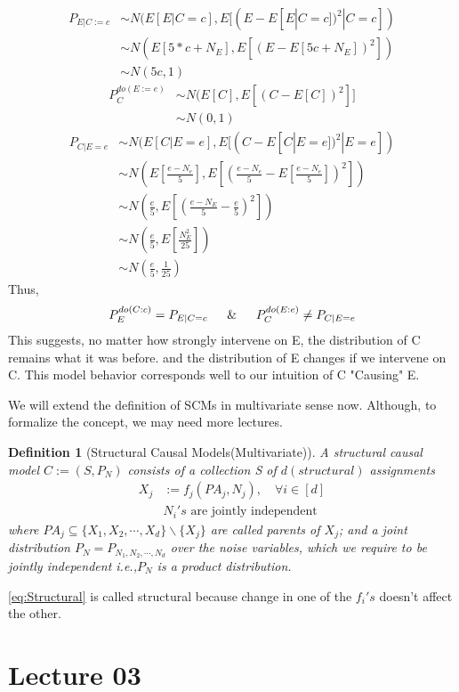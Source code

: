 \documentclass{article}
\newtheorem{definition}{Definition}[section]
\begin{document}
    \begin{align*}
        P_{E|C:=c} &\sim N(E[E|C=c],E[(E-E[E|C=c])^2|C=c])\\
        & \sim N(E[5*c+N_{E}],E[(E-E[5c+N_{E}])^2])\\
        & \sim N(5c,1)
    \end{align*}
    \begin{align*}
        P_C^{do(E:=e)}&\sim N(E[C],E[(C-E[C])^2]]\\
        &\sim N(0,1)
    \end{align*}
    \begin{align*}
        P_{C|E=e} &\sim N(E[C|E=e],E[(C-E[C|E=e])^2|E=e])\\
        &\sim N \left (E\left [\frac{e-N_{e}}{5} \right 
    ], E[\left( \frac{e-N_{e}}{5}-E\left [ \frac{e-N_{e}}{5}\right ]\right )^2]\right )\\
    & \sim N \left ( \frac{e}{5},E \left [ \left ( \frac{e-N_E}{5}-\frac{e}{5}\right )^2\right ]\right )\\
    & \sim N \left ( \frac{e}{5}, E \left [ \frac{N_E^2}{25}\right ]\right )\\
    & \sim N \left( \frac{e}{5},\frac{1}{25} \right)
    \end{align*}
    Thus,
    \begin{align}
        P_E^{do(C:c)}=P_{E|C=c} \quad \And \quad P_{C}^{do(E:e)} \neq P_{C|E=e}
    \end{align}
    This suggests, no matter how strongly intervene on E, the distribution of C remains what it was before.
    and the distribution of E changes if we intervene on C.
    This model behavior corresponds well to our intuition of C "Causing" E.

    We will extend the definition of SCMs in multivariate sense now. Although, to formalize the concept, we may need more lectures.
    \begin{definition}[Structural Causal Models(Multivariate)]
    A structural causal model $C:=(S,P_{N})$ consists of a collection S of $d(structural)$ assignments
    \begin{align}
      \label{eq:Structural}  X_{j}&:=f_{j}(PA_j,N_j), \quad \forall i\in [d]\\
        &\text{$N_{i}'s$ are jointly independent}
    \end{align}
    where $PA_{j} \subseteq \{ X_1,X_2,\cdots,X_{d}\} \backslash \{X_j\}$ are called parents of $X_j$; and a joint distribution $P_{N}=P_{N_1,N_2,\cdots,N_d}$ over the noise variables, which we require to be jointly independent i.e.,$P_N$ is a product distribution.
    \end{definition}
    \cref{eq:Structural} is called structural because change in one of the $f_i's$ doesn't affect the other.

    \section{Lecture 03}
%	
%	
	
\end{document}

